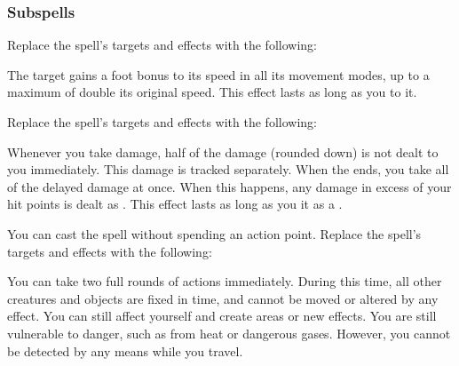 \subsubsection{Subspells}
Replace the spell's targets and effects with the following:
\begin{spellcontent}
\begin{augmenttargetinginfo}
\end{augmenttargetinginfo}
\begin{augmenteffects}
\spelleffect
The target gains a  foot bonus to its speed in all its movement modes, up to a maximum of double its original speed.
This effect lasts as long as you  to it.
\end{augmenteffects}
\end{spellcontent}
Replace the spell's targets and effects with the following:
\begin{spellcontent}
\begin{augmenttargetinginfo}
\end{augmenttargetinginfo}
\begin{augmenteffects}
\spelleffect
Whenever you take damage, half of the damage (rounded down) is not dealt to you immediately.
This damage is tracked separately.
When the ends, you take all of the delayed damage at once.
When this happens, any damage in excess of your hit points is dealt as .
This effect lasts as long as you  it as a .
\end{augmenteffects}
\end{spellcontent}
You can cast the spell without spending an action point.
Replace the spell's targets and effects with the following:
\begin{spellcontent}
\begin{augmenttargetinginfo}
\end{augmenttargetinginfo}
\begin{augmenteffects}
\spelleffect
You can take two full rounds of actions immediately.
During this time, all other creatures and objects are fixed in time, and cannot be moved or altered by any effect.
You can still affect yourself and create areas or new effects.
You are still vulnerable to danger, such as from heat or dangerous gases. However, you cannot be detected by any means while you travel.
\end{augmenteffects}
\end{spellcontent}
